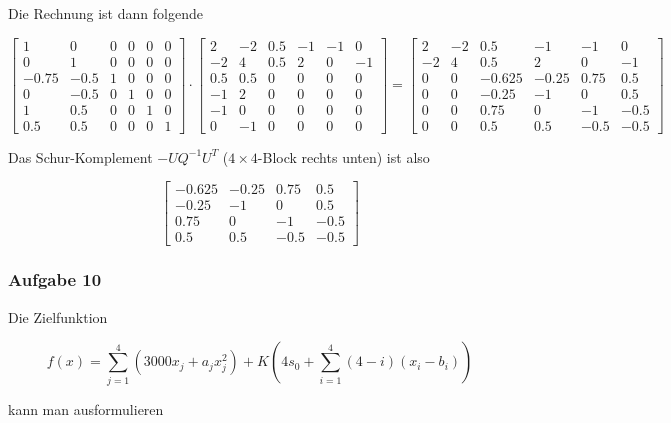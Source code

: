\documentclass[a4paper, 12pt]{report}
\begin{document}
Die Rechnung ist dann folgende

\begin{adjustwidth}{-55pt}{0pt}
$$ \begin{bmatrix}1 & 0 & 0 & 0 & 0 & 0\\0 & 1 & 0 & 0 & 0 & 0\\-0.75 & -0.5 & 1 & 0 & 0 & 0\\0 & -0.5 & 0 & 1 & 0 & 0\\1 & 0.5 & 0 & 0 & 1 & 0\\ 0.5 & 0.5 & 0 & 0 & 0 & 1\end{bmatrix} \cdot \begin{bmatrix}2 & -2 & 0.5 & -1 & -1 & 0\\-2 & 4 & 0.5 & 2 & 0 & -1\\0.5 & 0.5 & 0 & 0 & 0 & 0\\-1 & 2 & 0 & 0 & 0 & 0\\-1 & 0 & 0 & 0 & 0 & 0\\0 & -1 & 0 & 0 & 0 & 0\end{bmatrix} = \begin{bmatrix} 2 & -2 & 0.5 & -1 & -1 & 0\\-2 & 4 & 0.5 & 2 & 0 & -1\\ 0 & 0 & -0.625 & -0.25 & 0.75 & 0.5\\ 0 & 0 & -0.25 & -1 & 0 & 0.5\\0 & 0 & 0.75 & 0 & -1 & -0.5\\0 & 0 & 0.5 & 0.5 & -0.5 & -0.5 \end{bmatrix} $$
\end{adjustwidth}

Das Schur-Komplement $-UQ^{-1}U^T$ ($4 \times 4$-Block rechts unten) ist also

$$ \begin{bmatrix} -0.625 & -0.25 & 0.75 & 0.5\\ -0.25 & -1 & 0 & 0.5\\ 0.75 & 0 & -1 & -0.5\\0.5 & 0.5 & -0.5 & -0.5 \end{bmatrix} $$

\subsubsection{Aufgabe 10}
Die Zielfunktion

$$ f(x) = \sum_{j=1}^4 \left(3000x_j + a_jx_j^2\right) + K\left(4s_0 + \sum_{i=1}^4 (4-i)(x_i-b_i)\right) $$

kann man ausformulieren
\end{document}
